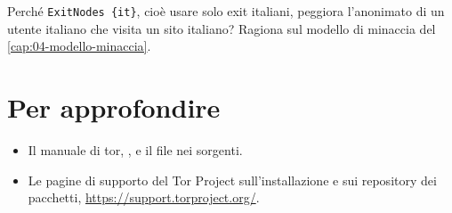 \begin{esercizio}[2]\label{es:17-exitnodes}
Perché \texttt{ExitNodes \{it\}}, cioè usare solo exit italiani, peggiora l'anonimato di un utente italiano che visita un sito italiano? Ragiona sul modello di minaccia del \cref{cap:04-modello-minaccia}.
\end{esercizio}

\section*{Per approfondire}
\begin{itemize}
  \item Il manuale di tor, , e il file  nei sorgenti.
  \item Le pagine di supporto del Tor Project sull'installazione e sui repository dei pacchetti, \url{https://support.torproject.org/}.
\end{itemize}
